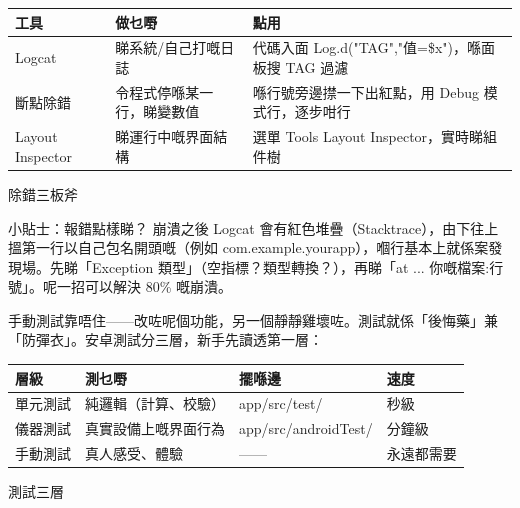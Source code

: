 


\begin{center}
\begin{tabularx}{\linewidth}{|X|X|X|}
\hline
\textbf{工具} & \textbf{做乜嘢} & \textbf{點用} \tabularnewline
\hline
Logcat & 睇系統/自己打嘅日誌 & 代碼入面 Log.d("TAG","值=\$x")，喺面板搜 TAG 過濾 \tabularnewline
斷點除錯 & 令程式停喺某一行，睇變數值 & 喺行號旁邊㩒一下出紅點，用 Debug 模式行，逐步咁行 \tabularnewline
Layout Inspector & 睇運行中嘅界面結構 & 選單 Tools Layout Inspector，實時睇組件樹 \tabularnewline
\hline
\end{tabularx}
\end{center}

\begin{center}\small\color{gray}除錯三板斧\end{center}

\begin{tcbinfo}{小貼士：報錯點樣睇？}
崩潰之後 Logcat 會有紅色堆疊（Stacktrace），由下往上搵第一行以自己包名開頭嘅（例如 com.example.yourapp），嗰行基本上就係案發現場。先睇「Exception 類型」（空指標？類型轉換？），再睇「at ... 你嘅檔案:行號」。呢一招可以解決 80\% 嘅崩潰。

\end{tcbinfo}


手動測試靠唔住——改咗呢個功能，另一個靜靜雞壞咗。測試就係「後悔藥」兼「防彈衣」。安卓測試分三層，新手先讀透第一層：

\begin{center}
\begin{tabularx}{\linewidth}{|X|X|X|X|}
\hline
\textbf{層級} & \textbf{測乜嘢} & \textbf{擺喺邊} & \textbf{速度} \tabularnewline
\hline
單元測試 & 純邏輯（計算、校驗） & app/src/test/ & 秒級 \tabularnewline
儀器測試 & 真實設備上嘅界面行為 & app/src/androidTest/ & 分鐘級 \tabularnewline
手動測試 & 真人感受、體驗 & —— & 永遠都需要 \tabularnewline
\hline
\end{tabularx}
\end{center}

\begin{center}\small\color{gray}測試三層\end{center}

